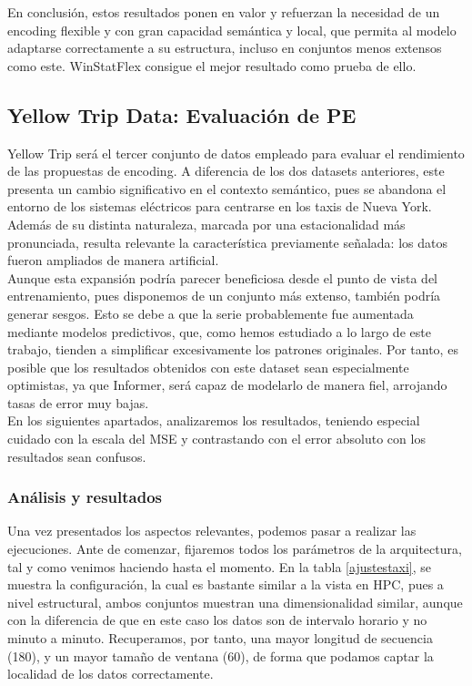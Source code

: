 En conclusión, estos resultados ponen en valor y refuerzan la necesidad de un encoding flexible y con gran capacidad semántica y local, que permita al modelo adaptarse correctamente a su estructura, incluso en conjuntos menos extensos como este. WinStatFlex consigue el mejor resultado como prueba de ello.

\subsection{Yellow Trip Data: Evaluación de PE}

Yellow Trip será el tercer conjunto de datos empleado para evaluar el rendimiento de las propuestas de encoding. A diferencia de los dos datasets anteriores, este presenta un cambio significativo en el contexto semántico, pues se abandona el entorno de los sistemas eléctricos para centrarse en los taxis de Nueva York. Además de su distinta naturaleza, marcada por una estacionalidad más pronunciada, resulta relevante la característica previamente señalada: los datos fueron ampliados de manera artificial. \\

Aunque esta expansión podría parecer beneficiosa desde el punto de vista del entrenamiento, pues disponemos de un conjunto más extenso, también podría generar sesgos. Esto se debe a que la serie probablemente fue aumentada mediante modelos predictivos, que, como hemos estudiado a lo largo de este trabajo, tienden a simplificar excesivamente los patrones originales. Por tanto, es posible que los resultados obtenidos con este dataset sean especialmente optimistas, ya que Informer, será capaz de modelarlo de manera fiel, arrojando tasas de error muy bajas.\\

En los siguientes apartados, analizaremos los resultados, teniendo especial cuidado con la escala del MSE y contrastando con el error absoluto con los resultados sean confusos.

\subsubsection{Análisis y resultados}

Una vez presentados los aspectos relevantes, podemos pasar a realizar las ejecuciones. Ante de comenzar, fijaremos todos los parámetros de la arquitectura, tal y como venimos haciendo hasta el momento. En la tabla \ref{ajustestaxi}, se muestra la configuración, la cual es bastante similar a la vista en HPC, pues a nivel estructural, ambos conjuntos muestran una dimensionalidad similar, aunque con la diferencia de que en este caso los datos son de intervalo horario y no minuto a minuto. Recuperamos, por tanto, una mayor longitud de secuencia (180), y un mayor tamaño de ventana (60), de forma que podamos captar la localidad de los datos correctamente.

